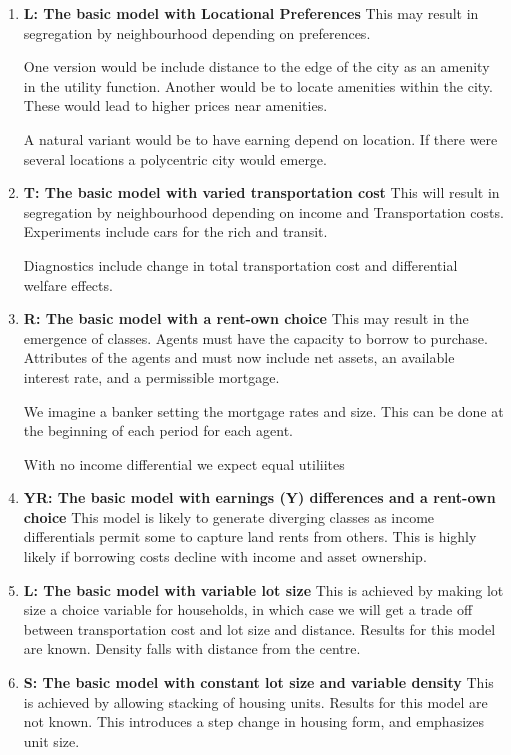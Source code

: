 \begin{enumerate}

\item \textbf{L: The basic model with Locational Preferences}
This may result in segregation by neighbourhood depending on preferences.

One version would be include distance to the edge of the city as an amenity in the utility function. Another would be to locate amenities within the city. These would lead to higher prices near amenities.

A natural variant would be to have earning depend on location. If there were several locations  a polycentric city would emerge.

\item \textbf{T: The basic model with varied transportation cost }
This will result in segregation by neighbourhood depending on income and Transportation costs. Experiments include cars for the rich and  transit. 

Diagnostics include change in total transportation cost and differential welfare effects.

\item \textbf{R: The basic model with a rent-own choice}
This may result in the emergence of classes. Agents must have the capacity to borrow to purchase. Attributes of the agents and must now include  net assets,  an available interest rate, and a permissible mortgage.

We imagine a banker setting the mortgage rates and size. This can be done at the beginning of each period for each agent. 

With no income differential we expect equal utiliites

\item \textbf{YR: The basic model with earnings (Y) differences and a rent-own choice}
This model is likely to generate diverging classes as income differentials permit some to capture land rents from others. This is highly likely if borrowing costs decline with income and asset ownership.

\item \textbf{L: The basic model with variable lot size}
This is achieved by making lot size a choice variable for households, in which case we will get a trade off between transportation cost and lot size and distance. Results for this model are known. Density  falls with distance from the centre. 

\item \textbf{S: The basic model with constant lot size and variable density}
This is achieved by allowing stacking of housing units. Results for this model are not known. This introduces a step change in housing form, and emphasizes unit size.
\end{enumerate}

